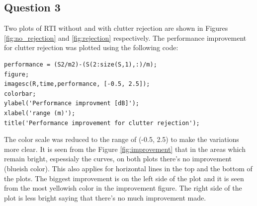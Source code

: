 \documentclass{article}
\begin{document}
\subsection{Question 3}
Two plots of RTI without and with clutter rejection are shown in Figures \ref{fig:no_rejection} and \ref{fig:rejection} respectively.
The performance improvement for clutter rejection was plotted using the following code:
\begin{lstlisting}
performance = (S2/m2)-(S(2:size(S,1),:)/m);
figure;
imagesc(R,time,performance, [-0.5, 2.5]);
colorbar;
ylabel('Performance improvment [dB]');
xlabel('range (m)');
title('Performance improvement for clutter rejection');
\end{lstlisting}

The color scale was reduced to the range of (-0.5, 2.5) to make the variations more clear. It is seen from the Figure \ref{fig:improvement} that in the areas which remain bright, espessialy the curves, on both plots there's no improvement (blueish color). This also applies for horizontal lines in the top and the bottom of the plots. The biggest improvement is on the left side of the plot and it is seen from the most yellowish color in the improvement figure. The right side of the plot is less bright saying that there's no much improvement made.
\end{document}
